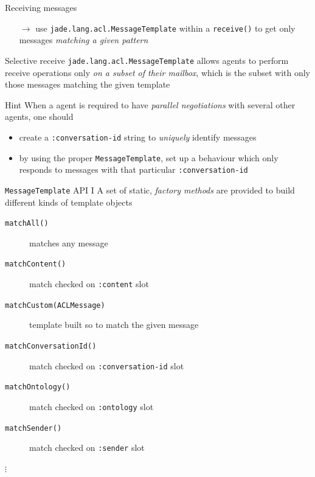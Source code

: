 \documentclass{beamer}\mode<presentation>{\usetheme{AMSCesenaPurpleAndGold}}
\begin{document}
\begin{frame}[c,allowframebreaks]
\begin{block}{Receiving messages}
\begin{itemize}
\begin{itemize}
                \item[$\rightarrow$] use \alert{\texttt{jade.lang.acl.MessageTemplate}} within a \texttt{receive()} to get only messages \emph{matching a given pattern}
            \end{itemize}
        \end{itemize}
    \end{block}
    \begin{block}{Selective receive}
        \texttt{jade.lang.acl.MessageTemplate} allows \jade{} agents to perform receive operations only \emph{on a subset of their mailbox}, which is the subset with only those messages \alert{matching} the given template
    \end{block}
    \begin{block}{Hint}
        When a \jade{} agent is required to have \emph{parallel negotiations} with several other agents, one should
        \begin{itemize}
            \item create a \texttt{:conversation-id} string to \emph{uniquely} identify messages
            \item by using the proper \texttt{MessageTemplate}, set up a behaviour which only responds to messages with that particular \texttt{:conversation-id}
        \end{itemize}
    \end{block}
    \begin{block}{\texttt{MessageTemplate} API I}
        A set of static, \emph{factory methods} are provided to build different kinds of template objects
        \begin{description}
            \item[\texttt{matchAll()}] matches any \acl{} message
            \item[\texttt{matchContent()}] match checked on \texttt{:content} slot
            \item[\texttt{matchCustom(ACLMessage)}] template built so to match the given \acl{} message
            \item[\texttt{matchConversationId()}] match checked on \texttt{:conversation-id} slot
            \item[\texttt{matchOntology()}] match checked on \texttt{:ontology} slot
            \item[\texttt{matchSender()}] match checked on \texttt{:sender} slot
            \item[$\vdots$]

\end{description}
\end{block}
\end{frame}
\end{document}
